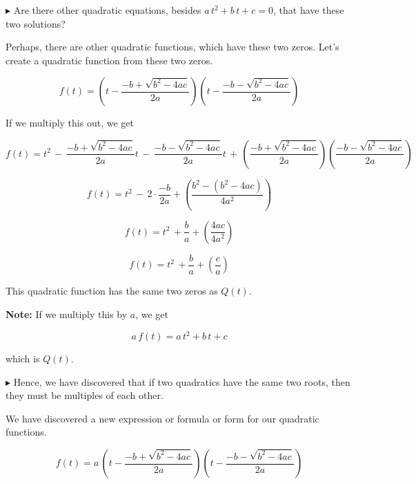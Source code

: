 \documentclass{ximera}
\begin{document}
$\blacktriangleright$  Are there other quadratic equations, besides $a \, t^2 + b \, t + c = 0$, that have these two solutions?















Perhaps, there are other quadratic functions, which have these two zeros. Let's create a quadratic function from these two zeros.



\[ f(t) =  \left(t - \frac{-b + \sqrt{b^2 - 4 a c}}{2a}\right)   \left(t -  \frac{-b - \sqrt{b^2 - 4 a c}}{2a}\right)   \]


If we multiply this out, we get



\[ f(t) =   t^2 \, - \, \frac{-b + \sqrt{b^2 - 4 a c}}{2a} t \, - \, \frac{-b - \sqrt{b^2 - 4 a c}}{2a}  t \, + \, \left(\frac{-b + \sqrt{b^2 - 4 a c}}{2a}\right) \left(\frac{-b - \sqrt{b^2 - 4 a c}}{2a}\right) \]


\[ f(t) = t^2  \, - \, 2 \cdot \frac{-b}{2a} + \left(    \frac{b^2 - (b^2 - 4 a c)}{4 a^2}     \right)        \]


\[ f(t) = t^2  \, + \frac{b}{a} + \left(    \frac{4 a c}{4 a^2}     \right)        \]

\[ f(t) = t^2  \, +  \frac{b}{a} + \left(    \frac{c}{a}     \right)        \]


This quadratic function has the same two zeros as $Q(t)$.  


\textbf{Note:} If we multiply this by $a$, we get 


\[ a \, f(t) = a \, t^2 + b \, t + c \]

which is $Q(t)$.


$\blacktriangleright$ Hence, we have discovered that if two quadratics have the same two roots, then they must be multiples of each other.






We have discovered a new expression or formula or form for our quadratic functions.





\[ f(t) =  a \, \left(t - \frac{-b + \sqrt{b^2 - 4 a c}}{2a}\right)   \left(t -  \frac{-b - \sqrt{b^2 - 4 a c}}{2a}\right)   \]
\end{document}
